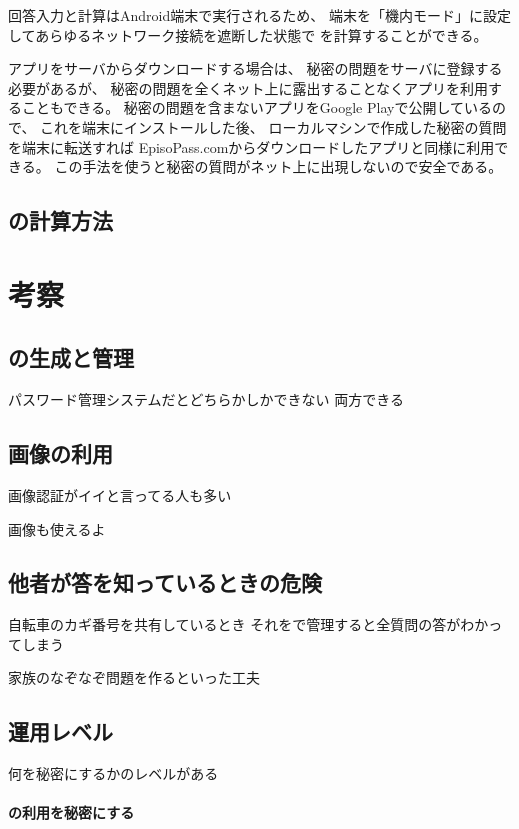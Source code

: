 \documentclass[twoside]{wiss}
\begin{document}
回答入力と{\PW}計算はAndroid端末で実行されるため、
端末を「機内モード」に設定してあらゆるネットワーク接続を遮断した状態で
{\PW}を計算することができる。

{\EP}アプリをサーバからダウンロードする場合は、
秘密の問題をサーバに登録する必要があるが、
秘密の問題を全くネット上に露出することなくアプリを利用することもできる。
秘密の問題を含まない{\EP}アプリをGoogle Playで公開しているので、
これを端末にインストールした後、
ローカルマシンで作成した秘密の質問を端末に転送すれば
EpisoPass.comからダウンロードしたアプリと同様に利用できる。
この手法を使うと秘密の質問がネット上に出現しないので安全である。

\subsection{{\PW}の計算方法}

\section{考察}

\subsection{{\PW}の生成と管理}

パスワード管理システムだとどちらかしかできない
両方できる

\subsection{画像の利用}

画像認証がイイと言ってる人も多い

画像も使えるよ

\subsection{他者が答を知っているときの危険}

自転車のカギ番号を共有しているとき
それを{\EP}で管理すると全質問の答がわかってしまう

家族のなぞなぞ問題を作るといった工夫

\subsection{運用レベル}

何を秘密にするかのレベルがある

\paragraph{{\EP}の利用を秘密にする}
\end{document}
